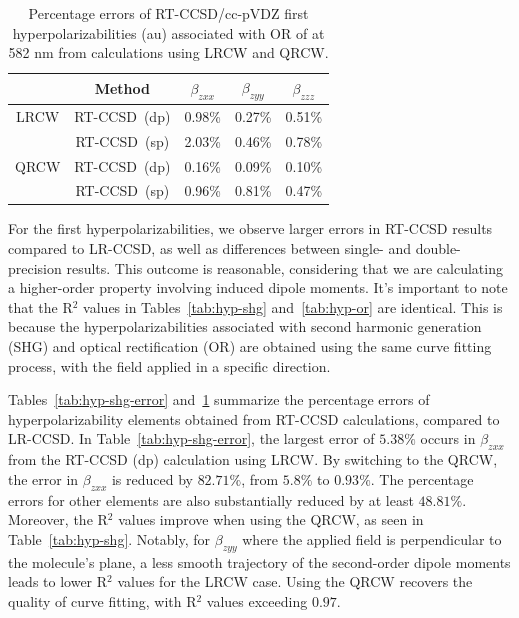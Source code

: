 \begin{table}
  \centering
    \caption{Percentage errors of RT-CCSD/cc-pVDZ first hyperpolarizabilities (au) associated with OR of  at 582 nm from calculations using LRCW and QRCW.}
  \begin{tabular}{c|c|ccc}
                                        &  \textrm{Method}  & $\beta_{zxx}$ & $\beta_{zyy}$ & $\beta_{zzz}$ \\
                                          \hline                   
     \textrm{LRCW} & \textrm{RT-CCSD\ (dp)} & 0.98\% & 0.27\% &  0.51\%  \\
                              & \textrm{RT-CCSD\ (sp)} & 2.03\% & 0.46\% & 0.78\%  \\
    \hline
     \textrm{QRCW} & \textrm{RT-CCSD\ (dp)} & 0.16\% & 0.09\% &  0.10\%  \\
                              & \textrm{RT-CCSD\ (sp)} & 0.96\% & 0.81\% & 0.47\%  \\
     \end{tabular}
  \label{tab:hyp-or-error}
\end{table}

For the first hyperpolarizabilities, we observe larger errors in RT-CCSD results compared to LR-CCSD, as well as differences between single- and double-precision results. This outcome is reasonable, considering that we are calculating a higher-order property involving induced dipole moments. It's important to note that the R$^{2}$ values in Tables~\ref{tab:hyp-shg} and~\ref{tab:hyp-or} are identical. This is because the hyperpolarizabilities associated with second harmonic generation (SHG) and optical rectification (OR) are obtained using the same curve fitting process, with the field applied in a specific direction.

Tables~\ref{tab:hyp-shg-error} and~\ref{tab:hyp-or-error} summarize the percentage errors of hyperpolarizability elements obtained from RT-CCSD calculations, compared to LR-CCSD. In Table~\ref{tab:hyp-shg-error}, the largest error of $5.38\%$ occurs in $\beta_{zxx}$ from the RT-CCSD (dp) calculation using LRCW. By switching to the QRCW, the error in $\beta_{zxx}$ is reduced by $82.71\%$, from $5.8\%$ to $0.93\%$. The percentage errors for other elements are also substantially reduced by at least $48.81\%$. Moreover, the R$^{2}$ values improve when using the QRCW, as seen in Table~\ref{tab:hyp-shg}. Notably, for $\beta_{zyy}$ where the applied field is perpendicular to the molecule's plane, a less smooth trajectory of the second-order dipole moments leads to lower R$^{2}$ values for the LRCW case. Using the QRCW recovers the quality of curve fitting, with R$^{2}$ values exceeding $0.97$.


